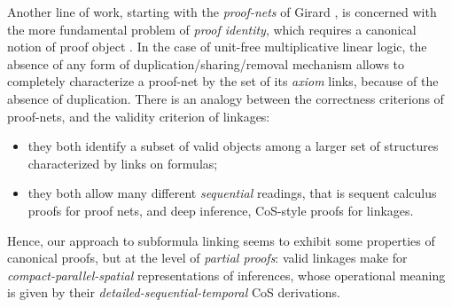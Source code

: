 Another line of work, starting with the \emph{proof-nets} of Girard
, is concerned with the more fundamental problem of
\emph{proof identity}, which requires a canonical notion of proof object
. In the case of unit-free multiplicative
linear logic, the absence of any form of duplication/sharing/removal mechanism
allows to completely characterize a proof-net by the set of its \emph{axiom}
links,
because of the absence of duplication.
There is an analogy between the correctness criterions of proof-nets, and the
validity criterion of linkages:
\begin{itemize}
  \item they both identify a subset of valid objects among a larger set of
  structures characterized by links on formulas;
  \item they both allow many different \emph{sequential} readings, that is
  sequent calculus proofs for proof nets, and deep inference, CoS-style proofs
  for linkages.
\end{itemize}
Hence, our approach to subformula linking seems to exhibit some properties of
canonical proofs, but at the level of \emph{partial proofs}: valid linkages make
for \emph{compact-parallel-spatial} representations of inferences, whose
operational meaning is given by their \emph{detailed-sequential-temporal} CoS
derivations.


